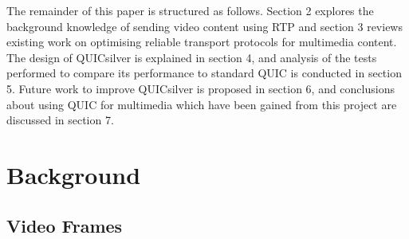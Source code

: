 \documentclass{mpaper}
\begin{document}




The remainder of this paper is structured as follows. Section 2 explores the background knowledge of sending video content using RTP and section 3 reviews existing work on optimising reliable transport protocols for multimedia content. The design of QUICsilver is explained in section 4, and analysis of the tests performed to compare its performance to standard QUIC is conducted in section 5. Future work to improve QUICsilver is proposed in section 6, and conclusions about using QUIC for multimedia which have been gained from this project are discussed in section 7.

%
%
\section{Background}


\subsection{Video Frames} 
\end{document}
